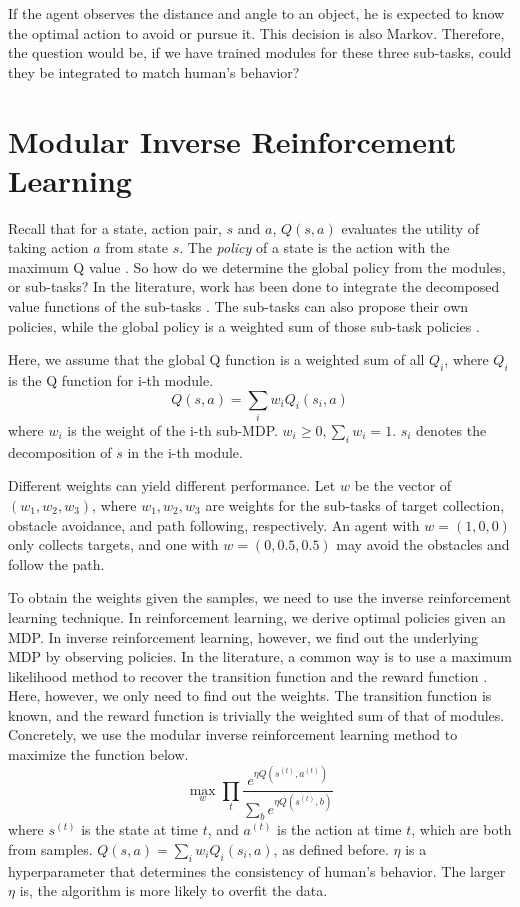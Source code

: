 If the agent observes the distance and angle to an object, he is expected to
know the optimal action to avoid or pursue it. This decision is also Markov.
Therefore, the question would be, if we have trained modules for these three
sub-tasks, could they be integrated to match human's behavior?

\section{Modular Inverse Reinforcement Learning}
\label{sec:rl}

Recall that for a state, action
pair, $s$ and $a$, $Q(s, a)$ evaluates the utility of taking action $a$ from
state $s$. The {\em policy} of a state is the action with the maximum Q
value \cite{rl}. So how do we determine the global policy from the modules, or
sub-tasks? In the literature, work has been done to integrate the decomposed
value functions of the sub-tasks \cite{koller1999computing}. The sub-tasks can
also propose their own policies, while the global policy is a weighted sum of
those sub-task policies \cite{thomas2012motor}.

Here, we assume that the global Q function is a weighted sum of all $Q_i$, where
$Q_i$ is the Q function for i-th module.
$$Q(s, a) = \sum_i w_i Q_i (s_i, a)$$
where $w_i$ is the weight of the i-th sub-MDP. $w_i \geq 0, \sum_i w_i = 1$.
$s_i$ denotes the decomposition of $s$ in the i-th module.

Different weights can yield different performance. Let $w$ be the vector of
$(w_1, w_2, w_3)$, where $w_1, w_2, w_3$ are weights for the sub-tasks of target
collection, obstacle avoidance, and path following, respectively. An agent with
$w = (1, 0, 0)$ only collects targets, and one with $w = (0, 0.5, 0.5)$ may
avoid the obstacles and follow the path.

To obtain the weights given the samples, we need to use the inverse
reinforcement learning technique. In reinforcement learning, we derive 
optimal policies given an MDP. In inverse reinforcement learning, however, we
find out the underlying MDP by observing policies. In the literature, a common
way is to use a maximum likelihood method to recover the transition function and
the reward function \cite{ng2000algorithms}. Here, however, we only need to find
out the weights. The transition function is known, and the reward function is
trivially the weighted sum of that of modules. Concretely, we use the modular
inverse reinforcement learning method \cite{rothkopf2013modular} to maximize the
function below.
\begin{equation}
\label{eq:irl}
\max_w \prod_t \frac{e^{\eta Q(s^{(t)}, a^{(t)})}}{\sum_b e^{\eta Q(s^{(t)}, b)}}
\end{equation}
where $s^{(t)}$ is the state at time $t$, and $a^{(t)}$ is the action at time
$t$, which are both from samples. $Q(s, a) = \sum_i w_i Q_i(s_i, a)$, as defined
before. $\eta$ is a hyperparameter that determines the consistency of human's
behavior. The larger $\eta$ is, the algorithm is more likely to overfit the data.

